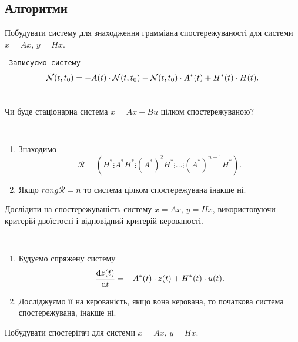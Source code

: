 \subsection{Алгоритми}

\begin{problem*}
    Побудувати систему для знаходження грамміана спостережуваності для системи $\dot x = A x$, $y = H x$.
\end{problem*}

\begin{algorithm} \tt
    Записуємо систему \[ \dot {\mathcal{N}}(t, t_0) = -A(t) \cdot \mathcal{N}(t, t_0) - \mathcal{N}(t, t_0) \cdot A^*(t) + H^*(t) \cdot H(t). \]
\end{algorithm}

\begin{problem*}
    Чи буде стаціонарна система $\dot x = A x + B u$ цілком спостережуваною?
\end{problem*}

\begin{algorithm} \tt 
    \begin{enumerate}
        \item Знаходимо \[ \mathcal{R} = \left(H^* \vdots A^* H^* \vdots (A^*)^2 H^* \vdots \ldots \vdots (A^*)^{n-1} H^*\right).\] 
        \item Якщо $rang \mathcal{R} = n$ то система цілком спостережувана інакше ні.
    \end{enumerate}
\end{algorithm}

\begin{problem*}
    Дослідити на спостережуваність систему $\dot x = A x$, $y = H x$, використовуючи критерій двоїстості і відповідний критерій керованості.
\end{problem*}

\begin{algorithm} \tt
    \begin{enumerate}
        \item Будуємо спряжену систему \[ \frac{\mathop{}\!\mathrm{d} z(t)}{\mathop{}\!\mathrm{d} t} = - A^*(t) \cdot z(t) + H^*(t) \cdot u(t). \]
        \item Досліджуємо її на керованість, якщо вона керована, то по\-чат\-ко\-ва \allowbreak сис\-те\-ма спостережувана, інакше ні.
    \end{enumerate}
\end{algorithm}

\begin{problem*}
    Побудувати спостерігач для системи $\dot x = A x$, $y = H x$.
\end{problem*}

